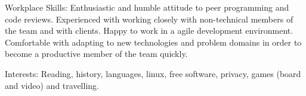 
\inlineheadsection 
{Workplace Skills:} {Enthusiastic and humble attitude to peer programming and code reviews. Experienced with working closely with non-technical members of the team and with clients. Happy to work in a agile development environment. Comfortable with adapting to new technologies and problem domains in order to become a productive member of the team quickly.}

\inlineheadsection 
{Interests:} {Reading, history, languages, linux, free software, privacy, games (board and video) and travelling.}
